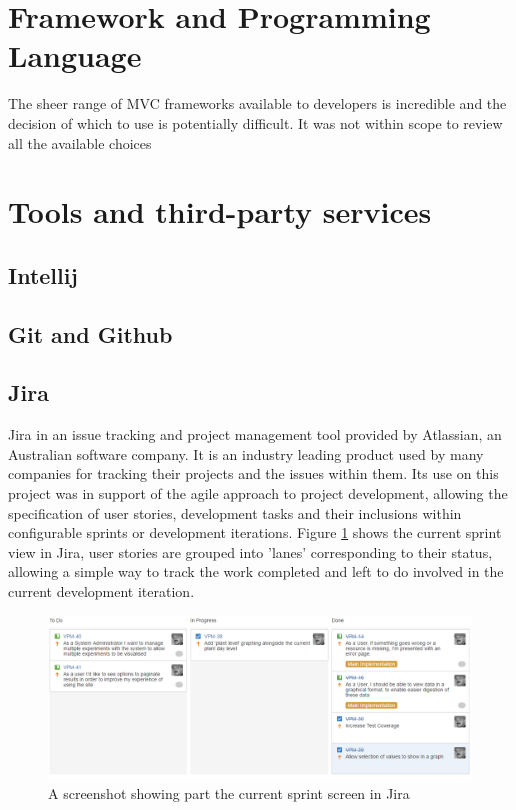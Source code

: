 \section{Framework and Programming Language}

The sheer range of MVC frameworks available to developers is incredible and the decision of which to use is potentially difficult. It was not within scope to review all the available choices 


\section{Tools and third-party services}
\subsection{Intellij}
\subsection{Git and Github}
\subsection{Jira}

Jira \cite{jira} in an issue tracking and project management tool provided by Atlassian, an Australian software company. It is an industry leading product used by many companies for tracking their projects and the issues within them. Its use on this project was in support of the agile approach to project development, allowing the specification of user stories, development tasks and their inclusions within configurable sprints or development iterations. Figure \ref{fig:jira_sprint} shows the current sprint view in Jira, user stories are grouped into 'lanes' corresponding to their status, allowing a simple way to track the work completed and left to do involved in the current development iteration.

\begin{figure}[H]
    \centering
    \includegraphics[width=\textwidth]{images/tools/sprint1}
    \caption{A screenshot showing part the current sprint screen in Jira}
    \label{fig:jira_sprint}
\end{figure} 

